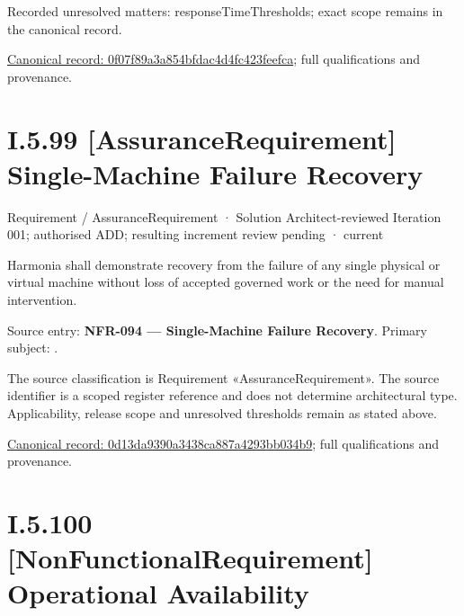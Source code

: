 {\small Recorded unresolved matters: responseTimeThresholds; exact scope remains in the canonical record.}\par
{\footnotesize \href{../../../../../../../../continuum/motivation/requirement/non-functional-requirement/0f07f89a3a854bfdac4d4fc423feefca.md}{Canonical record: 0f07f89a3a854bfdac4d4fc423feefca}; full qualifications and provenance.}\par
\section*{I.5.99 [AssuranceRequirement] Single-Machine Failure Recovery}
\label{navigation:I.5.99}

\label{element:0d13da9390a3438ca887a4293bb034b9}
{\small Requirement / AssuranceRequirement · Solution Architect-reviewed Iteration 001; authorised ADD; resulting increment review pending · current}\par

Harmonia shall demonstrate recovery from the failure of any single physical or virtual machine without loss of accepted governed work or the need for manual intervention.



Source entry: \textbf{NFR-094 — Single-Machine Failure Recovery}. Primary subject: \texttt{}.



The source classification is Requirement «AssuranceRequirement». The source identifier is a scoped register reference and does not determine architectural type. Applicability, release scope and unresolved thresholds remain as stated above.


{\footnotesize \href{../../../../../../../../continuum/motivation/requirement/assurance-requirement/0d13da9390a3438ca887a4293bb034b9.md}{Canonical record: 0d13da9390a3438ca887a4293bb034b9}; full qualifications and provenance.}\par
\section*{I.5.100 [NonFunctionalRequirement] Operational Availability}
\label{navigation:I.5.100}

